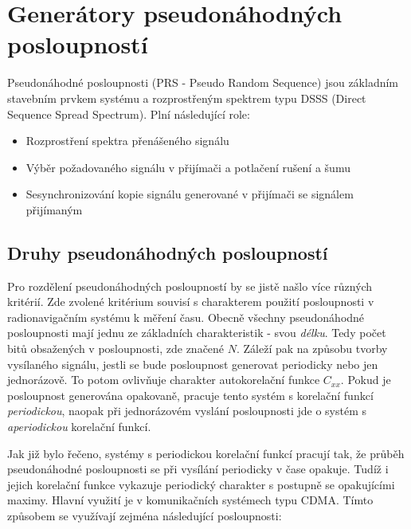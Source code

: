 \section{Generátory pseudonáhodných posloupností}



\marginpar{\textcolor{txt_blue}{Role pseudonáhodných posloupností v systému s rozprostřeným spektrem}} 
Pseudonáhodné posloupnosti (PRS - Pseudo Random Sequence) jsou základním stavebním prvkem systému a rozprostřeným spektrem typu DSSS (Direct Sequence Spread Spectrum). Plní následující role: 

\begin{itemize}
\item Rozprostření spektra přenášeného signálu
\item Výběr požadovaného signálu v přijímači a potlačení rušení a šumu
\item Sesynchronizování kopie signálu generované v přijímači se signálem přijímaným
\end{itemize}

 
\vspace{0.25in}



\subsection{Druhy pseudonáhodných posloupností}

Pro rozdělení pseudonáhodných posloupností by se jistě našlo více různých kritérií. Zde zvolené kritérium \cite{holmes2007} \cite{levanon2004radar} souvisí s charakterem použití posloupnosti v radionavigačním  systému k měření času. Obecně všechny pseudonáhodné posloupnosti mají jednu ze základních charakteristik - svou \textsl{délku}. Tedy počet bitů obsažených v posloupnosti, zde značené $N$. Záleží pak na způsobu tvorby vysílaného signálu, jestli se bude posloupnost generovat periodicky nebo jen jednorázově. To potom ovlivňuje charakter autokorelační funkce $C_{xx}$. Pokud je posloupnost generována opakovaně, pracuje tento systém s korelační funkcí \textsl{periodickou}, naopak při jednorázovém vyslání posloupnosti jde o systém s \textsl{aperiodickou} korelační  funkcí.

\marginpar{\textcolor{txt_blue}{Posloupnosti využívané s periodickou korelační funkcí}} 
Jak již bylo řečeno, systémy s periodickou korelační funkcí pracují tak, že průběh pseudonáhodné posloupnosti se při vysílání periodicky v čase opakuje. Tudíž i jejich korelační funkce vykazuje periodický charakter s postupně se opakujícími maximy. Hlavní využití je v komunikačních systémech typu CDMA. Tímto způsobem se využívají zejména následující posloupnosti:

